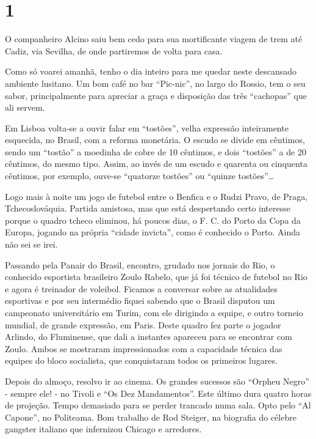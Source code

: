 \section*{1 \adfflatleafright {}}
O companheiro Alcino saiu bem cedo para sua mortificante viagem de trem até Cadiz, via Sevilha, de onde partiremos de volta para casa.

Como só voarei amanhã, tenho o dia inteiro para me quedar neste descansado ambiente lusitano. Um bom café no bar “Pic-nic”, no largo do Rossio, tem o seu sabor, principalmente para apreciar a graça e disposição das três “cachopas” que ali servem.

Em Lisboa volta-se a ouvir falar em “tostões”, velha expressão inteiramente esquecida, no Brasil, com a reforma monetária. O escudo se divide em cêntimos, sendo um “tostão” a moedinha de cobre de 10 cêntimos, e dois “tostões” a de 20 cêntimos, do mesmo tipo. Assim, ao invés de um escudo e quarenta ou cinquenta cêntimos, por exemplo, ouve-se “quatorze tostões” ou “quinze tostões”\ldots

Logo mais à noite um jogo de futebol entre o Benfica e o Rudzi Pravo, de Praga, Tchecoslováquia. Partida amistosa, mas que está despertando certo interesse porque o quadro tcheco eliminou, há poucos dias, o F. C. do Porto da Copa da Europa, jogando na própria “cidade invicta”, como é conhecido o Porto. Ainda não sei se irei.

Passando pela Panair do Brasil, encontro, grudado nos jornais do Rio, o conhecido esportista brasileiro Zoulo Rabelo, que já foi técnico de futebol no Rio e agora é treinador de voleibol. Ficamos a conversar sobre as atualidades esportivas e por seu intermédio fiquei sabendo que o Brasil disputou um campeonato universitário em Turim, com ele dirigindo a equipe, e outro torneio mundial, de grande expressão, em Paris. Deste quadro fez parte o jogador Arlindo, do Fluminense, que dali a instantes apareceu para se encontrar com Zoulo. Ambos se mostraram impressionados com a capacidade técnica das equipes do bloco socialista, que conquistaram todos os primeiros lugares.

Depois do almoço, resolvo ir ao cinema. Os grandes sucessos são “Orpheu Negro” - sempre ele! - no Tivoli e “Os Dez Mandamentos”. Este último dura quatro horas de projeção. Tempo demasiado para se perder trancado numa sala. Opto pelo “Al Capone”, no Politeama. Bom trabalho de Rod Steiger, na biografia do célebre gangster italiano que infernizou Chicago e arredores.

